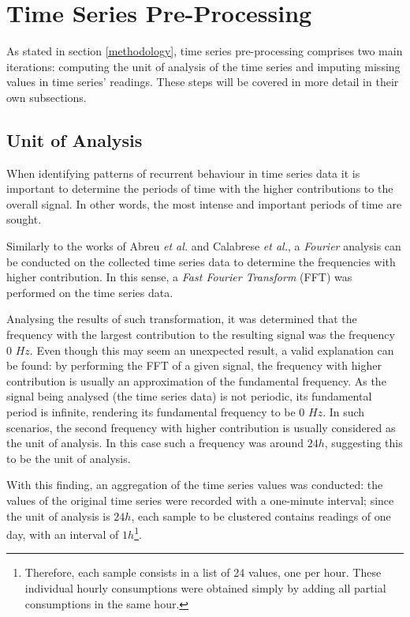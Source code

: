\documentclass[9pt,journal,compsoc]{IEEEtran}
\begin{document}
\section{Time Series Pre-Processing}
\label{pre_processing}

As stated in section \ref{methodology}, time series pre-processing comprises two main iterations: computing the unit of analysis of the time series and imputing missing values in time series' readings. These steps will be covered in more detail in their own subsections.

\subsection{Unit of Analysis}

When identifying patterns of recurrent behaviour in time series data it is important to determine the periods of time with the higher contributions to the overall signal. In other words, the most intense and important periods of time are sought.

Similarly to the works of Abreu \emph{et al.}\cite{abreu2012using} and Calabrese \emph{et al.}\cite{calabrese2010eigenplaces}, a \emph{Fourier} analysis can be conducted on the collected time series data to determine the frequencies with higher contribution. In this sense, a \emph{Fast Fourier  Transform} (FFT) was performed on the time series data. 

Analysing the results of such transformation, it was determined that the frequency with the largest contribution to the resulting signal was the frequency 0 $Hz$. Even though this may seem an unexpected result, a valid explanation can be found: by performing the FFT of a given signal, the frequency with higher contribution is usually an approximation of the fundamental frequency. As the signal being analysed (the time series data) is not periodic, its fundamental period is infinite, rendering its fundamental frequency to be 0 $Hz$. In such scenarios, the second frequency with higher contribution is usually considered as the unit of analysis. In this case such a frequency was around $24h$, suggesting this to be the unit of analysis.

With this finding, an aggregation of the time series values was conducted: the values of the original time series were recorded with a one-minute interval; since the unit of analysis is $24h$, each sample to be clustered contains readings of one day, with an interval of $1h$\footnote{Therefore, each sample consists in a list of 24 values, one per hour. These individual hourly consumptions were obtained simply by adding all partial consumptions in the same hour.}.
\end{document}
